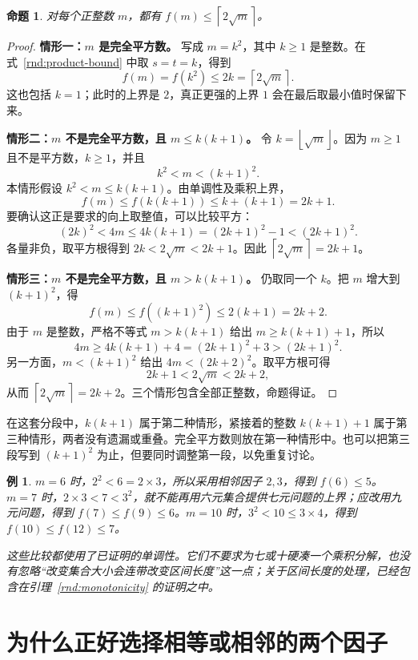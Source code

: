 \documentclass[UTF8,a4paper,oneside,openany,fontset=fandol,zihao=-4]{ctexbook}
\theoremstyle{guide}
\newtheorem{proposition}[theorem]{命题}
\newtheorem{example}[theorem]{例}
\newcommand{\ceil}[1]{\left\lceil#1\right\rceil}
\newcommand{\floor}[1]{\left\lfloor#1\right\rfloor}
\begin{document}
\begin{proposition}\label{rnd:ceiling-upper}
对每个正整数 $m$，都有 $f(m)\leq\ceil{2\sqrt m}$。
\end{proposition}

\begin{proof}
\textbf{情形一：$m$ 是完全平方数。}
写成 $m=k^2$，其中 $k\geq1$ 是整数。在式~\eqref{rnd:product-bound} 中取 $s=t=k$，得到
\[
f(m)=f(k^2)\leq2k=\ceil{2\sqrt m}.
\]
这也包括 $k=1$；此时的上界是 $2$，真正更强的上界 $1$ 会在最后取最小值时保留下来。

\textbf{情形二：$m$ 不是完全平方数，且 $m\leq k(k+1)$。}
令 $k=\floor{\sqrt m}$。因为 $m\geq1$ 且不是平方数，$k\geq1$，并且
\[
k^2<m<(k+1)^2.
\]
本情形假设 $k^2<m\leq k(k+1)$。由单调性及乘积上界，
\[
f(m)\leq f(k(k+1))\leq k+(k+1)=2k+1.
\]
要确认这正是要求的向上取整值，可以比较平方：
\[
(2k)^2<4m\leq4k(k+1)=(2k+1)^2-1<(2k+1)^2.
\]
各量非负，取平方根得到 $2k<2\sqrt m<2k+1$。因此 $\ceil{2\sqrt m}=2k+1$。

\textbf{情形三：$m$ 不是完全平方数，且 $m>k(k+1)$。}
仍取同一个 $k$。把 $m$ 增大到 $(k+1)^2$，得
\[
f(m)\leq f((k+1)^2)\leq2(k+1)=2k+2.
\]
由于 $m$ 是整数，严格不等式 $m>k(k+1)$ 给出 $m\geq k(k+1)+1$，所以
\[
4m\geq4k(k+1)+4=(2k+1)^2+3>(2k+1)^2.
\]
另一方面，$m<(k+1)^2$ 给出 $4m<(2k+2)^2$。取平方根可得
\[
2k+1<2\sqrt m<2k+2,
\]
从而 $\ceil{2\sqrt m}=2k+2$。三个情形包含全部正整数，命题得证。
\end{proof}

在这套分段中，$k(k+1)$ 属于第二种情形，紧接着的整数 $k(k+1)+1$ 属于第三种情形，两者没有遗漏或重叠。完全平方数则放在第一种情形中。也可以把第三段写到 $(k+1)^2$ 为止，但要同时调整第一段，以免重复讨论。

\begin{example}\label{rnd:small-upper-examples}
$m=6$ 时，$2^2<6=2\times3$，所以采用相邻因子 $2,3$，得到 $f(6)\leq5$。$m=7$ 时，$2\times3<7<3^2$，就不能再用六元集合提供七元问题的上界；应改用九元问题，得到 $f(7)\leq f(9)\leq6$。$m=10$ 时，$3^2<10\leq3\times4$，得到 $f(10)\leq f(12)\leq7$。

这些比较都使用了已证明的单调性。它们不要求为七或十硬凑一个乘积分解，也没有忽略“改变集合大小会连带改变区间长度”这一点；关于区间长度的处理，已经包含在引理~\ref{rnd:monotonicity} 的证明之中。
\end{example}

\section{为什么正好选择相等或相邻的两个因子}
\end{document}
